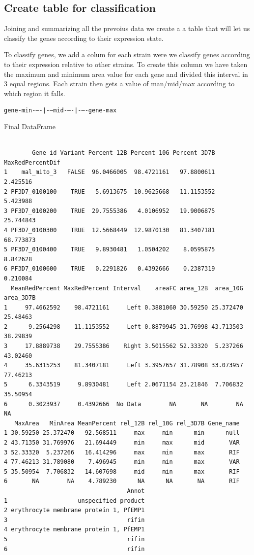 \documentclass[11pt]{article}
\begin{document}
\subsection{Create table for classification}
\label{sec:org01967d0}

Joining and summarizing all the prevoius data we create a a table that will let us classify the genes according to their expression state.

To classify genes, we add a colum for each strain were we classify genes according to their expression relative to other strains.
To create this column we have taken the maximum and minimum area value for each gene and divided this interval in 3 equal regions. Each strain then gets a value of man/mid/max according to which region it falls.

\texttt{gene-min-{}--{}-|-{}--mid-{}--{}-|-{}--{}-gene-max}

Final DataFrame
\begin{verbatim}

        Gene_id Variant Percent_12B Percent_10G Percent_3D7B MaxRedPercentDif
1    mal_mito_3   FALSE  96.0466005  98.4721161   97.8800611         2.425516
2 PF3D7_0100100    TRUE   5.6913675  10.9625668   11.1153552         5.423988
3 PF3D7_0100200    TRUE  29.7555386   4.0106952   19.9006875        25.744843
4 PF3D7_0100300    TRUE  12.5668449  12.9870130   81.3407181        68.773873
5 PF3D7_0100400    TRUE   9.8930481   1.0504202    8.0595875         8.842628
6 PF3D7_0100600    TRUE   0.2291826   0.4392666    0.2387319         0.210084
  MeanRedPercent MaxRedPercent Interval    areaFC area_12B  area_10G area_3D7B
1     97.4662592    98.4721161     Left 0.3881060 30.59250 25.372470  25.48463
2      9.2564298    11.1153552     Left 0.8879945 31.76998 43.713503  38.29839
3     17.8889738    29.7555386    Right 3.5015562 52.33320  5.237266  43.02460
4     35.6315253    81.3407181     Left 3.3957657 31.78908 33.073957  77.46213
5      6.3343519     9.8930481     Left 2.0671154 23.21846  7.706832  35.50954
6      0.3023937     0.4392666  No Data        NA       NA        NA        NA
   MaxArea   MinArea MeanPercent rel_12B rel_10G rel_3D7B Gene_name
1 30.59250 25.372470   92.568511     max     min      min      null
2 43.71350 31.769976   21.694449     min     max      mid       VAR
3 52.33320  5.237266   16.414296     max     min      max       RIF
4 77.46213 31.789080    7.496945     min     min      max       VAR
5 35.50954  7.706832   14.607698     mid     min      max       RIF
6       NA        NA    4.789230      NA      NA       NA       RIF
                                   Annot
1                    unspecified product
2 erythrocyte membrane protein 1, PfEMP1
3                                  rifin
4 erythrocyte membrane protein 1, PfEMP1
5                                  rifin
6                                  rifin
\end{verbatim}
\end{document}

